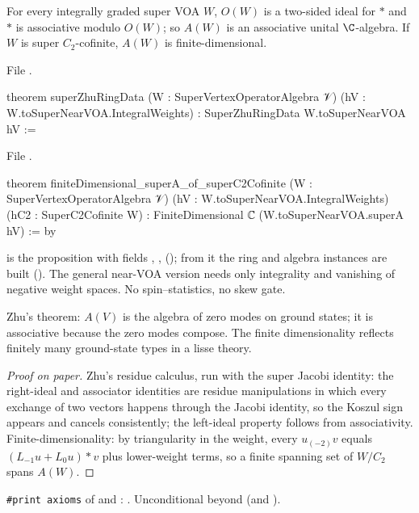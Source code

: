 \begin{theorem}\label{l17:thm:superzhuring}
For every integrally graded super VOA $W$, $O(W)$ is a two-sided ideal for $\ast$ and $\ast$ is
associative modulo $O(W)$; so $A(W)$ is an associative unital $\C$-algebra. If $W$ is super
$C_2$-cofinite, $A(W)$ is finite-dimensional.
\end{theorem}
\noindent File .
\begin{leancode}
theorem superZhuRingData (W : SuperVertexOperatorAlgebra 𝒱)
    (hV : W.toSuperNearVOA.IntegralWeights) :
    SuperZhuRingData W.toSuperNearVOA hV :=
\end{leancode}
\noindent File .
\begin{leancode}
theorem finiteDimensional_superA_of_superC2Cofinite (W : SuperVertexOperatorAlgebra 𝒱)
    (hV : W.toSuperNearVOA.IntegralWeights) (hC2 : SuperC2Cofinite W) :
    FiniteDimensional ℂ (W.toSuperNearVOA.superA hV) := by
\end{leancode}
\begin{dictionary}
 is the proposition with fields , ,
 (); from it the ring and algebra instances
are built (). The general near-VOA version  needs
only integrality and vanishing of negative weight spaces. No spin--statistics, no skew gate.
\end{dictionary}
\begin{physics}
Zhu's theorem: $A(V)$ is the algebra of zero modes on ground states; it is associative because the
zero modes compose. The finite dimensionality reflects finitely many ground-state types in a lisse
theory.
\end{physics}
\begin{proof}[Proof on paper]
Zhu's residue calculus, run with the super Jacobi identity: the right-ideal and associator identities
are residue manipulations in which every exchange of two vectors happens through the Jacobi identity,
so the Koszul sign appears and cancels consistently; the left-ideal property follows from
associativity. Finite-dimensionality: by triangularity in the weight, every $u_{(-2)}v$ equals
$(L_{-1}u+L_0u)\ast v$ plus lower-weight terms, so a finite spanning set of $W/C_2$ spans $A(W)$.
\end{proof}
\begin{status}
\texttt{\#print axioms} of  and
: . Unconditional beyond  (and ).
\end{status}

